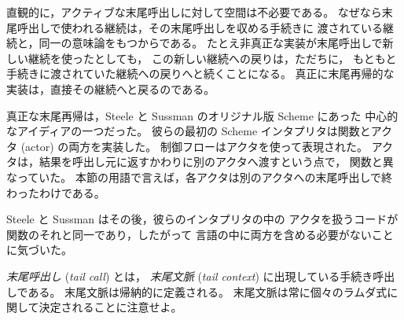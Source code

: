 \begin{rationale}

直観的に，アクティブな末尾呼出しに対して空間は不必要である。
なぜなら末尾呼出しで使われる継続は，その末尾呼出しを収める手続きに
渡されている継続と，同一の意味論をもつからである。
たとえ非真正な実装が末尾呼出しで新しい継続を使ったとしても，
この新しい継続への戻りは，ただちに，
もともと手続きに渡されていた継続への戻りへと続くことになる。
真正に末尾再帰的な実装は，直接その継続へと戻るのである。

真正な末尾再帰は，Steele と Sussman のオリジナル版 Scheme にあった
中心的なアイディアの一つだった。
彼らの最初の Scheme インタプリタは関数とアクタ (actor) の両方を実装した。
制御フローはアクタを使って表現された。
アクタは，結果を呼出し元に返すかわりに別のアクタへ渡すという点で，
関数と異なっていた。
本節の用語で言えば，各アクタは別のアクタへの末尾呼出しで終わったわけである。

Steele と Sussman はその後，彼らのインタプリタの中の
アクタを扱うコードが関数のそれと同一であり，したがって
言語の中に両方を含める必要がないことに気づいた。

\end{rationale}

{\em 末尾呼出し} ({\em tail call}\/) とは，
{\em 末尾文脈} ({\em tail context}\/) に出現している手続き呼出しである。
末尾文脈は帰納的に定義される。
末尾文脈は常に個々のラムダ式に関して決定されることに注意せよ。

